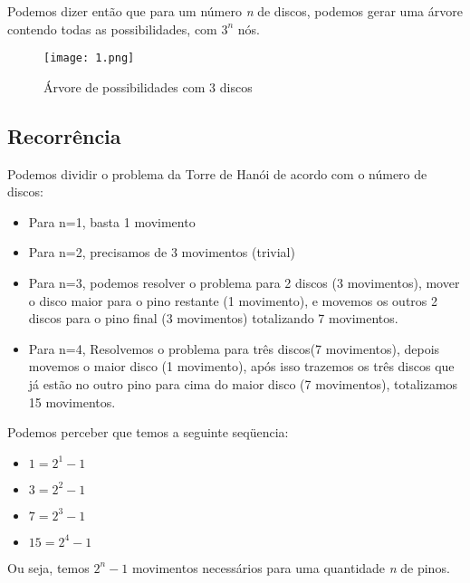 \documentclass[10pt,portuguese,notheorems,compress]{beamer}
\begin{document}
\begin{frame}
Podemos dizer então que para um número \textit{n} de discos, podemos gerar uma árvore contendo todas as possibilidades, com $3^n$ nós.
\begin{figure}[H]
\texttt{[image: 1.png]}
\caption*{\small{Árvore de possibilidades com 3 discos}}
\end{figure}
\end{frame}

\subsection{Recorrência}
\begin{frame}
Podemos dividir o problema da Torre de Hanói de acordo com o número de discos:
\begin{itemize}
\item Para n=1, basta 1 movimento
\item Para n=2, precisamos de 3 movimentos (trivial)
\item Para n=3, podemos resolver o problema para 2 discos (3 movimentos), mover o disco maior para o pino restante (1 movimento), e movemos os outros 2 discos para o pino final (3 movimentos) totalizando 7 movimentos.
\item Para n=4, Resolvemos o problema para três discos(7 movimentos), depois movemos o maior disco (1 movimento), após isso trazemos os três discos que já estão no outro pino para cima do maior disco (7 movimentos), totalizamos 15 movimentos.
\end{itemize}
\end{frame}

\begin{frame}
Podemos perceber que temos a seguinte seqüencia:
\begin{itemize}
\item $1=2^1 -1$
\item $3=2^2 -1$
\item $7=2^3 -1$
\item $15=2^4 -1$
\end{itemize}
Ou seja, temos $2^n-1$ movimentos necessários para uma quantidade \textit{n} de pinos.
\end{frame}
\end{document}
